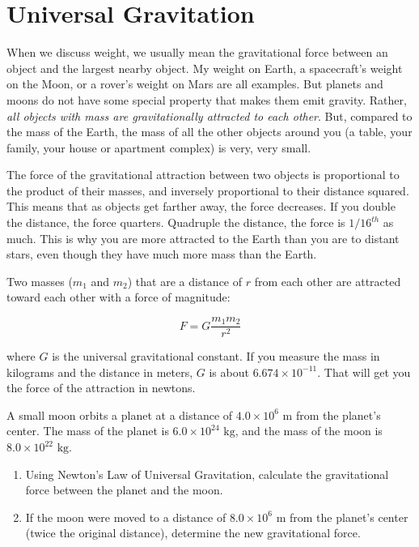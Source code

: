 \section{Universal Gravitation}
When we discuss weight, we usually mean the gravitational force between an object and the largest nearby object. My weight on Earth, a spacecraft's weight on the Moon, or a rover's weight on Mars are all examples. But planets and moons do not have some special property that makes them emit gravity. Rather, \textit{all objects with mass are gravitationally attracted to each other}. But, compared to the mass of the Earth, the mass of all the other objects around you (a table, your family, your house or apartment complex) is very, very small.

The
force of the gravitational attraction between two objects is proportional to the product
of their masses, and inversely proportional to their distance squared.
This means that as objects get farther away, the force decreases. If you double the distance, the force quarters. Quadruple the distance, the force is $1/16^{th}$ as much.
This is why you are more attracted to the Earth than you are to
distant stars, even though they have much more mass than the Earth.

\begin{mdframed}[style=important, frametitle={Newton's Law of Universal Gravitation}]

  Two masses ($m_1$ and $m_2$) that are a distance of
  $r$ from each other are attracted toward each other with a force of
  magnitude:

  \begin{equation}
    F = G\frac{m_1 m_2}{r^2} \label{eq:univGrav}
  \end{equation}

  where $G$ is the universal gravitational constant. If you measure the
  mass in kilograms and the distance in meters, $G$ is about $6.674
    \times 10^{-11}$. That will get you the force of the attraction in
  newtons.

\end{mdframed}

\begin{Exercise}[title={Gravitation between two planets}, label=moon_and_planet]
  A small moon orbits a planet at a distance of $4.0 \times 10^6 \text{ m}$ from the planet's center. The mass of the planet is $6.0 \times 10^{24} \text{ kg}$, and the mass of the moon is $8.0 \times 10^{22} \text{ kg}$.

  \begin{enumerate}
    \item Using Newton's Law of Universal Gravitation, calculate the gravitational force between the planet and the moon.
    \item If the moon were moved to a distance of $8.0 \times 10^6 \text{ m}$ from the planet's center (twice the original distance), determine the new gravitational force.
  \end{enumerate}
\end{Exercise}

